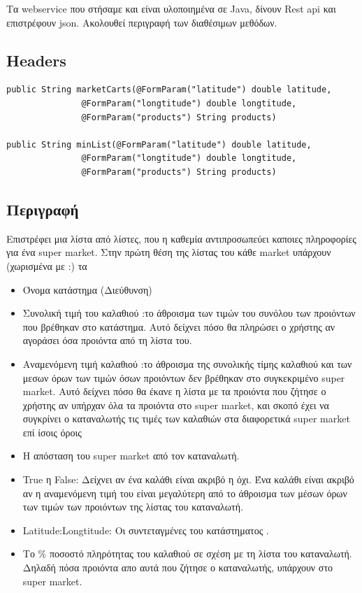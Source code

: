 \documentclass[a4paper,10pt]{report}
\begin{document}
Τα webservice που στήσαμε και είναι υλοποιημένα σε Java, δίνουν Rest api και επιστρέφουν json.
Ακολουθεί περιγραφή των διαθέσιμων μεθόδων.
\subsection{Headers}
\begin{verbatim}
public String marketCarts(@FormParam("latitude") double latitude,
			   @FormParam("longtitude") double longtitude,
			   @FormParam("products") String products)
			   
public String minList(@FormParam("latitude") double latitude,
			   @FormParam("longtitude") double longtitude,
			   @FormParam("products") String products)
\end{verbatim}

\subsection{Περιγραφή}
Επιστρέφει μια λίστα από λίστες, που η καθεμία αντιπροσωπεύει καποιες πληροφορίες για ένα super market. Στην πρώτη θέση της λίστας του κάθε market υπάρχουν (χωρισμένα με :) τα
\\
\begin{itemize}
 \item Όνομα κατάστημα  (Διεύθυνση)
 \item Συνολική τιμή του καλαθιού :το άθροισμα των τιμών του συνόλου των προιόντων που βρέθηκαν στο κατάστημα. Αυτό δείχνει πόσο θα πληρώσει ο χρήστης αν αγοράσει όσα προιόντα από τη λίστα του.
 \item Αναμενόμενη τιμή καλαθιού :το άθροισμα της συνολικής τίμης καλαθιού και των μεσων όρων των τιμών όσων προιόντων δεν βρέθηκαν στο συγκεκριμένο super market. Αυτό δείχνει πόσο θα έκανε η λίστα με τα προιόντα που ζήτησε ο χρήστης αν υπήρχαν όλα τα προιόντα στο super market, και σκοπό έχει να συγκρίνει ο καταναλωτής τις τιμές των καλαθιών στα διαφορετικά super market επί ίσοις όροις 
 \item Η απόσταση του super market από τον καταναλωτή.
 \item True η False: Δείχνει αν ένα καλάθι είναι ακριβό η όχι. Ένα καλάθι είναι ακριβό αν η αναμενόμενη τιμή του είναι μεγαλύτερη από το άθροισμα των μέσων όρων των τιμών των προιόντων της λίστας του καταναλωτή.
 \item Latitude:Longtitude: Οι συντεταγμένες του κατάστηματος .
 \item Το \% ποσοστό πληρότητας του καλαθιού σε σχέση με τη λίστα του καταναλωτή. Δηλαδή πόσα προιόντα απο αυτά που ζήτησε ο καταναλωτής, υπάρχουν στο super market.
 
\end{itemize}
\end{document}
